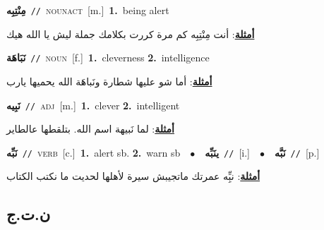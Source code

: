 \documentclass[10pt,a4paper,twoside]{article} %
\begin{document}
\begin{multicols}{2}
{{{{{{{{\setlength\topsep{0pt}\textbf{\foreignlanguage{arabic}{مِنْتِبِه}}\ {\color{gray}\texttt{//}\color{black}}\ \textsc{noun\textunderscore act}\ [m.]\ \textbf{1.}~being alert\  \begin{flushright}\color{gray}\foreignlanguage{arabic}{\textbf{\underline{\foreignlanguage{arabic}{أمثلة}}}: أنت مِنْتِبِه كم مرة كررت بكلامك جملة ليش يا الله هيك}\end{flushright}\color{black}} \vspace{2mm}

{\setlength\topsep{0pt}\textbf{\foreignlanguage{arabic}{نَبَاهَة}}\ {\color{gray}\texttt{//}\color{black}}\ \textsc{noun}\ [f.]\ \textbf{1.}~cleverness  \textbf{2.}~intelligence\  \begin{flushright}\color{gray}\foreignlanguage{arabic}{\textbf{\underline{\foreignlanguage{arabic}{أمثلة}}}: أما شو عليها شطارة ونَباهَة الله يحميها يارب}\end{flushright}\color{black}} \vspace{2mm}

{\setlength\topsep{0pt}\textbf{\foreignlanguage{arabic}{نَبِيه}}\ {\color{gray}\texttt{//}\color{black}}\ \textsc{adj}\ [m.]\ \textbf{1.}~clever  \textbf{2.}~intelligent\  \begin{flushright}\color{gray}\foreignlanguage{arabic}{\textbf{\underline{\foreignlanguage{arabic}{أمثلة}}}: لما نَبيهة اسم الله. بتلقطها عالطاير}\end{flushright}\color{black}} \vspace{2mm}

{\setlength\topsep{0pt}\textbf{\foreignlanguage{arabic}{نَبِّه}}\ {\color{gray}\texttt{//}\color{black}}\ \textsc{verb}\ [c.]\ \textbf{1.}~alert sb.  \textbf{2.}~warn sb\ \ $\bullet$\ \ \setlength\topsep{0pt}\textbf{\foreignlanguage{arabic}{ينَبِّه}}\ {\color{gray}\texttt{//}\color{black}}\ [i.]\ \ $\bullet$\ \ \setlength\topsep{0pt}\textbf{\foreignlanguage{arabic}{نَبَّه}}\ {\color{gray}\texttt{//}\color{black}}\ [p.]\  \begin{flushright}\color{gray}\foreignlanguage{arabic}{\textbf{\underline{\foreignlanguage{arabic}{أمثلة}}}: نبِِّه عمرتك ماتجيبش سيرة لأهلها لحديت ما نكتب الكتاب}\end{flushright}\color{black}} \vspace{2mm}

\vspace{-3mm}
\subsection*{\color{blue}\foreignlanguage{arabic}{ن.ت.ج}\color{blue}{}} 

}}}}}}}
\end{multicols}
\end{document}
